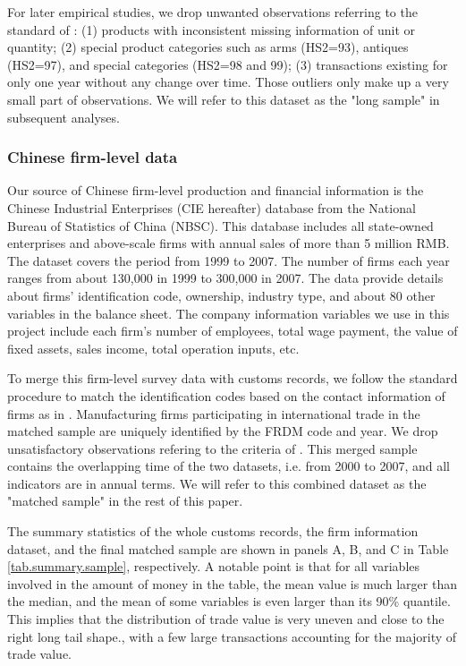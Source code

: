 \documentclass[12pt]{article}
\begin{document}
For later empirical studies, we drop unwanted observations referring to the standard of \cite{lmx2015}: (1) products with inconsistent missing information of unit or quantity; (2) special product categories such as arms (HS2=93), antiques (HS2=97), and special categories (HS2=98 and 99); (3) transactions existing for only one year without any change over time. Those outliers only make up a very small part of observations. We will refer to this dataset as the "long sample" in subsequent analyses.

\subsubsection{Chinese firm-level data} \label{Data-CIE}

Our source of Chinese firm-level production and financial information is the Chinese Industrial Enterprises (CIE hereafter) database from the National Bureau of Statistics of China (NBSC). This database includes all state-owned enterprises and above-scale firms with annual sales of more than 5 million RMB. The dataset covers the period from 1999 to 2007. The number of firms each year ranges from about 130,000 in 1999 to 300,000 in 2007. The data provide details about firms’ identification code, ownership, industry type, and about 80 other variables in the balance sheet. The company information variables we use in this project include each firm's number of employees, total wage payment, the value of fixed assets, sales income, total operation inputs, etc.

To merge this firm-level survey data with customs records, we follow the standard procedure to match the identification codes based on the contact information of firms as in \cite{fan-li-yeaple2015}. Manufacturing firms participating in international trade in the matched sample are uniquely identified by the FRDM code and year. We drop unsatisfactory observations refering to the criteria of \cite{bkl2021}. This merged sample contains the overlapping time of the two datasets, i.e. from 2000 to 2007, and all indicators are in annual terms. We will refer to this combined dataset as the "matched sample" in the rest of this paper.

The summary statistics of the whole customs records, the firm information dataset, and the final matched sample are shown in panels A, B, and C in Table \ref{tab.summary.sample}, respectively. A notable point is that for all variables involved in the amount of money in the table, the mean value is much larger than the median, and the mean of some variables is even larger than its 90\% quantile. This implies that the distribution of trade value is very uneven and close to the right long tail shape., with a few large transactions accounting for the majority of trade value.
\end{document}
